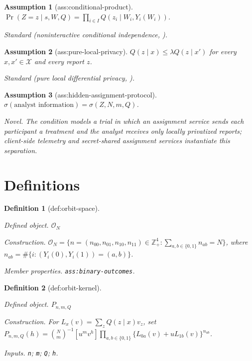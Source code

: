 \documentclass{article}
\newtheorem{assumption}{Assumption}
\newtheorem{definition}{Definition}
\begin{document}
\begin{assumption}[ass:conditional-product]\label{ass:conditional-product}
\(\Pr(Z=z\mid s,W,Q)=\prod_{i\in I}Q(z_i\mid W_i,Y_i(W_i))\).
\par\smallskip\noindent\emph{Standard} (noninteractive conditional independence, \cite{KairouzOhViswanath2016}).
\end{assumption}

\begin{assumption}[ass:pure-local-privacy]\label{ass:pure-local-privacy}
\(Q(z\mid x)\le\lambda Q(z\mid x')\) for every \(x,x'\in\mathcal X\) and every report \(z\).
\par\smallskip\noindent\emph{Standard} (pure local differential privacy, \cite{KairouzOhViswanath2016}).
\end{assumption}

\begin{assumption}[ass:hidden-assignment-protocol]\label{ass:hidden-assignment-protocol}
\(\sigma(\text{analyst information})=\sigma(Z,N,m,Q)\).
\par\smallskip\noindent\emph{Novel.} The condition models a trial in which an assignment service sends each participant a treatment and the analyst receives only locally privatized reports; client-side telemetry and secret-shared assignment services instantiate this separation.
\end{assumption}

\section{Definitions}

\begin{definition}[def:orbit-space]\label{def:orbit-space}
\par\smallskip\noindent\emph{Defined object.} \(\mathcal O_N\)
\par\smallskip\noindent\emph{Construction.} \(\mathcal O_N=\{n=(n_{00},n_{01},n_{10},n_{11})\in\mathbb Z_+^4:\sum_{a,b\in\{0,1\}}n_{ab}=N\}\), where \(n_{ab}=\#\{i:(Y_i(0),Y_i(1))=(a,b)\}\).
\par\smallskip\noindent\emph{Member properties.} \texttt{ass:\allowbreak{}binary-\allowbreak{}outcomes}.
\end{definition}

\begin{definition}[def:orbit-kernel]\label{def:orbit-kernel}
\par\smallskip\noindent\emph{Defined object.} \(P_{n,m,Q}\)
\par\smallskip\noindent\emph{Construction.} For \(L_x(v)=\sum_zQ(z\mid x)v_z\), set \(P_{n,m,Q}(h)=\binom{N}{m}^{-1}[u^mv^h]\prod_{a,b\in\{0,1\}}\{L_{0a}(v)+uL_{1b}(v)\}^{n_{ab}}\).
\par\smallskip\noindent\emph{Inputs.} \texttt{n}; \texttt{m}; \texttt{Q}; \texttt{h}.
\end{definition}
\end{document}

